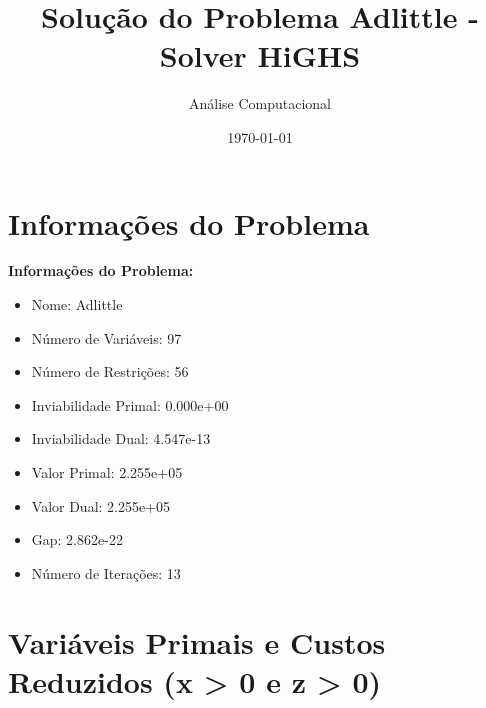 \documentclass[12pt]{article}
\title{Solução do Problema Adlittle - Solver HiGHS}
\author{Análise Computacional}
\date{\today}
\begin{document}
\maketitle

\section{Informações do Problema}

\textbf{Informações do Problema:}
\begin{itemize}
\item Nome: Adlittle
\item Número de Variáveis: 97
\item Número de Restrições: 56
\item Inviabilidade Primal: 0.000e+00
\item Inviabilidade Dual: 4.547e-13
\item Valor Primal: 2.255e+05
\item Valor Dual: 2.255e+05
\item Gap: 2.862e-22
\item Número de Iterações: 13
\end{itemize}


\section{Variáveis Primais e Custos Reduzidos (x > 0 e z > 0)}
\end{document}
